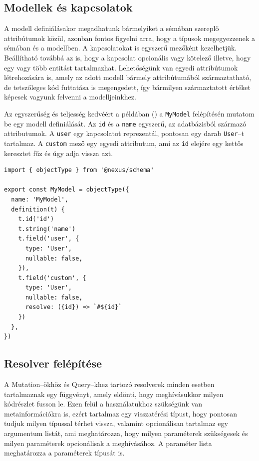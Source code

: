 \subsection{Modellek és kapcsolatok}
A modell definiálásakor megadhatunk bármelyiket a sémában szereplő attribútumok közül, azonban fontos figyelni arra, hogy a típusok megegyezzenek a sémában és a modellben.
A kapcsolatokat is egyszerű mezőként kezelhetjük. Beállítható továbbá az is, hogy a kapcsolat opcionális vagy kötelező illetve, hogy egy vagy több entitást tartalmazhat.
Lehetőségünk van egyedi attribútumok létrehozására is, amely az adott modell bármely attribútumából származtatható, de tetszőleges kód futtatása is megengedett, így bármilyen származtatott értéket képesek vagyunk felvenni a modelljeinkhez.

Az egyszerűség és teljesség kedvéért a példában () a \lstinline|MyModel| felépítésén mutatom be egy modell definiálását.
Az \lstinline|id| és a \lstinline|name| egyszerű, az adatbázisból származó attributumok. A \lstinline|user| egy kapcsolatot reprezentál, pontosan egy darab \lstinline|User|–t tartalmaz. 
A \lstinline|custom| mező egy egyedi attributum, ami az \lstinline|id| elejére egy kettős keresztet fűz és úgy adja vissza azt.
\begin{lstlisting}[style=ES6, caption={Példa model},label={lst:model}]
import { objectType } from '@nexus/schema'

export const MyModel = objectType({
  name: 'MyModel',
  definition(t) {
    t.id('id')
    t.string('name')
    t.field('user', {
      type: 'User',
      nullable: false,
    }),
    t.field('custom', {
      type: 'User',
      nullable: false,
      resolve: ({id}) => `#${id}`
    })
  },
})
\end{lstlisting}

\subsection{Resolver felépítése}
A Mutation–ökhöz és Query–khez tartozó resolverek minden esetben tartalmaznak egy függvényt, amely eldönti, hogy meghívásukkor milyen kódrészlet fusson le.
Ezen felül a használatukhoz szükségünk van metainformációkra is, ezért tartalmaz egy visszatérési típust, hogy pontosan tudjuk milyen típussal térhet vissza, valamint opcionálisan tartalmaz egy argumentum listát, ami meghatározza, hogy milyen paraméterek szükségesek és milyen paraméterek opcionálisak a meghívásához.
A paraméter lista meghatározza a paraméterek típusát is.

